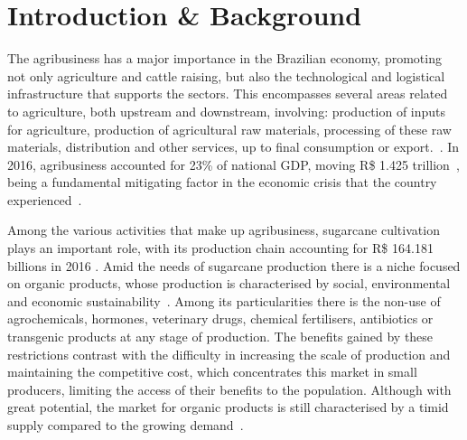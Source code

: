\documentclass[
    12pt,                       %
    oneside,                    %
    a4paper,                    %
    brazil,                     %
    french,                     %
    spanish,                    %
    english,                    %
    ]{abntex2}
\begin{document}
\tableofcontents*
\cleardoublepage


\textual


\chapter[Introduction \& Background]{Introduction \& Background}

  The agribusiness has a major importance in the Brazilian economy, promoting not only agriculture and cattle raising, but also the technological and logistical infrastructure that supports the sectors. This encompasses several areas related to agriculture, both upstream and downstream, involving: production of inputs for agriculture, production of agricultural raw materials, processing of these raw materials, distribution and other services, up to final consumption or export.~\cite{cepea}. In 2016, agribusiness accounted for 23\% of national GDP, moving R\$ 1.425 trillion~\cite{cna}, being a fundamental mitigating factor in the economic crisis that the country experienced~\cite{agro_canal_rural}.

  Among the various activities that make up agribusiness, sugarcane cultivation plays an important role, with its production chain accounting for R\$ 164.181 billions in 2016 \cite{cna}. Amid the needs of sugarcane production there is a niche focused on organic products, whose production is characterised by social, environmental and economic sustainability~\cite{organicos_canal_rural}. Among its particularities there is the non-use of agrochemicals, hormones, veterinary drugs, chemical fertilisers, antibiotics or transgenic products at any stage of production. The benefits gained by these restrictions contrast with the difficulty in increasing the scale of production and maintaining the competitive cost, which concentrates this market in small producers, limiting the access of their benefits to the population. Although with great potential, the market for organic products is still characterised by a timid supply compared to the growing demand~\cite{organicos_carta_capital}.
\end{document}
